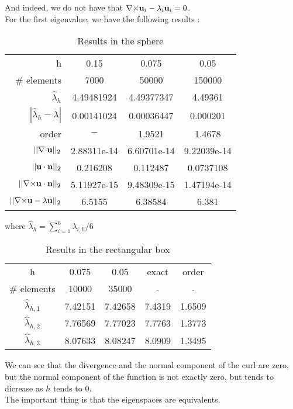 And indeed, we do not have that ${\nabla\times}{\mathbf{u}}_i-\lambda_i{\mathbf{u}}_i = 0$.\\
For the first eigenvalue, we have the following results :
\begin{table}[H]
  \centering
  \begin{tabular}{r|c|c|c}
    h & 0.15 & 0.075 & 0.05 \\
    \# elements & 7000 & 50000 & 150000 \\
    \hline
    $\widehat{\lambda}_h$ & 4.49481924 & 4.49377347 & 4.49361\\
    $|\widehat{\lambda}_h-\lambda|$ & 0.00141024 & 0.00036447 & 0.000201 \\
    order & $-$ & 1.9521 & 1.4678 \\
    \hline
    $||{\nabla\cdot}{\mathbf{u}}||_2$ & 2.88311e-14 & 6.60701e-14 & 9.22039e-14 \\
    $||{\mathbf{u}}\cdot{\mathbf{n}}||_2$ & 0.216208 & 0.112487 & 0.0737108 \\
    $||{\nabla\times}{\mathbf{u}}\cdot{\mathbf{n}}||_2$ & 5.11927e-15 & 9.48309e-15 & 1.47194e-14 \\
    $||{\nabla\times}{\mathbf{u}}-\lambda{\mathbf{u}}||_2$ & 6.5155 & 6.38584 & 6.381
  \end{tabular}
  \caption{Results in the sphere}
\end{table}
where $\widehat{\lambda}_h=\sum_{i=1}^6\lambda_{i,h}/6$

\begin{table}[H]
  \centering
  \begin{tabular}{c|cc|c|c}
    h & 0.075 & 0.05 & exact & order \\
    \# elements & 10000 & 35000 & - & - \\
    \hline
    $\widehat{\lambda}_{h,1}$ & 7.42151 & 7.42658 & 7.4319 & 1.6509 \\
    $\widehat{\lambda}_{h,2}$ & 7.76569 & 7.77023 & 7.7763 & 1.3773 \\
    $\widehat{\lambda}_{h,3}$ & 8.07633 &  8.08247 & 8.0909 & 1.3495
  \end{tabular}
  \caption{Results in the rectangular box}
\end{table}

We can see that the divergence and the normal component of the curl are zero, but the normal component of the function is not exactly zero, but tends to dicrease as $h$ tends to 0.\\
The important thing is that the eigenspaces are equivalents.\\



